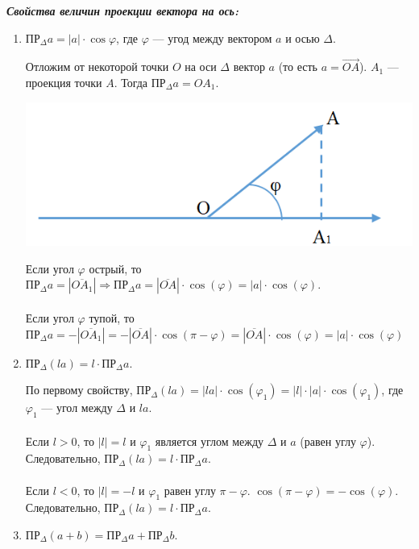\textbf{\textit{Свойства величин проекции вектора на ось:}}\begin{enumerate}
	\item $\text{ПР}_\Delta a = |a|\cdot \cos\varphi$, где $\varphi$ --- угод между вектором $a$ и осью $\Delta$.
	\begin{Proof}
		Отложим от некоторой точки $O$ на оси $\Delta$ вектор $a$ (то есть $a = \overrightarrow{OA}$). $A_1$ --- проекция точки $A$. Тогда $\text{ПР}_\Delta a = OA_1$.\begin{center}
			\includegraphics[scale=0.5]{images/corn2_3.png}
		\end{center}
		Если угол $\varphi$ острый, то $\text{ПР}_\Delta a = |\overline{OA_1}|\Rightarrow \text{ПР}_\Delta a = |\overline{OA}|\cdot \cos(\varphi) = |a|\cdot \cos(\varphi)$.\\\\
		Если угол $\varphi$ тупой, то $\text{ПР}_\Delta a = -|\overline{OA_1}| = -|\overline{OA}|\cdot \cos(\pi - \varphi) = |\overline{OA}|\cdot \cos(\varphi) = |a|\cdot \cos(\varphi)$
	\end{Proof}
	\item $\text{ПР}_\Delta (la) = l\cdot \text{ПР}_\Delta a$.\begin{Proof}
		По первому свойству, $\text{ПР}_\Delta (la) = |la|\cdot \cos(\varphi_1) = |l| \cdot |a| \cdot \cos(\varphi_1)$, где $\varphi_1$ --- угол между $\Delta$ и $la$.\\\\
		Если $l > 0$, то $|l| = l$ и $\varphi_1$ является углом между $\Delta$ и $a$ (равен углу $\varphi$). Следовательно, $\text{ПР}_\Delta (la) = l\cdot \text{ПР}_\Delta a$.\\\\
		Если $l < 0$, то $|l| = -l$ и $\varphi_1$ равен углу $\pi - \varphi$. $\cos(\pi-\varphi) = -\cos(\varphi)$. Следовательно, $\text{ПР}_\Delta (la) = l\cdot \text{ПР}_\Delta a$.
	\end{Proof}
	\item $\text{ПР}_\Delta (a+b) = \text{ПР}_\Delta a + \text{ПР}_\Delta b$.

\end{enumerate}
